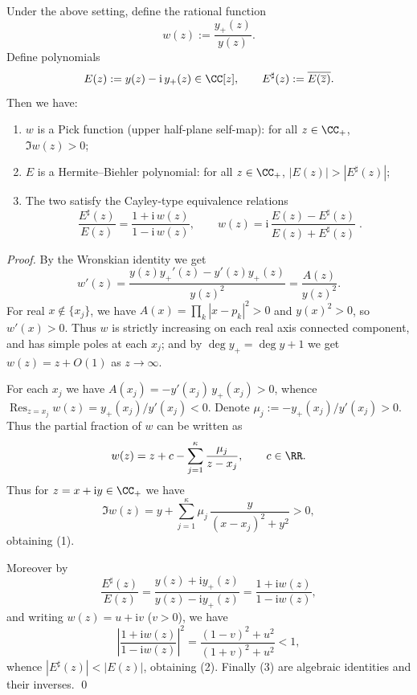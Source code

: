 \begin{conclusion}\label{con:xi-terminal-wronskian-hermite-biehler-pick-map}
Under the above setting, define the rational function
\[
w(z):=\frac{y_{+}(z)}{y(z)}.
\]
Define polynomials
\[
E(z):=y(z)-\mathrm{i}\,y_{+}(z)\in\CC[z],\qquad
E^\sharp(z):=\overline{E(\overline z)}.
\]
Then we have:
\begin{enumerate}
  \item \(w\) is a Pick function (upper half-plane self-map): for all \(z\in\CC_{+}\), \(\Im w(z)>0\);
  \item \(E\) is a Hermite--Biehler polynomial: for all \(z\in\CC_{+}\), \(|E(z)|>|E^\sharp(z)|\);
  \item The two satisfy the Cayley-type equivalence relations
  \[
  \boxed{\;
  \frac{E^\sharp(z)}{E(z)}=\frac{1+\mathrm{i}\,w(z)}{1-\mathrm{i}\,w(z)},
  \qquad
  w(z)=\mathrm{i}\,\frac{E(z)-E^\sharp(z)}{E(z)+E^\sharp(z)}\; } .
  \]
\end{enumerate}
\end{conclusion}
\begin{proof}
By the Wronskian identity we get
\[
w'(z)=\frac{y(z)y_{+}'(z)-y'(z)y_{+}(z)}{y(z)^2}=\frac{A(z)}{y(z)^2}.
\]
For real \(x\notin\{x_j\}\), we have \(A(x)=\prod_k|x-p_k|^2>0\) and \(y(x)^2>0\), so \(w'(x)>0\).
Thus \(w\) is strictly increasing on each real axis connected component, and has simple poles at each \(x_j\); and by \(\deg y_{+}=\deg y+1\) we get \(w(z)=z+O(1)\) as \(z\to\infty\).
\par
For each \(x_j\) we have \(A(x_j)=-y'(x_j)\,y_{+}(x_j)>0\), whence
\(
\operatorname*{Res}_{z=x_j}w(z)=y_{+}(x_j)/y'(x_j)<0
\).
Denote \(\mu_j:=-y_{+}(x_j)/y'(x_j)>0\).
Thus the partial fraction of \(w\) can be written as
\[
w(z)=z+c-\sum_{j=1}^{\kappa}\frac{\mu_j}{z-x_j},\qquad c\in\RR.
\]
Thus for \(z=x+\mathrm{i}y\in\CC_{+}\) we have
\[
\Im w(z)=y+\sum_{j=1}^{\kappa}\mu_j\,\frac{y}{(x-x_j)^2+y^2}>0,
\]
obtaining (1).
\par
Moreover by
\[
\frac{E^\sharp(z)}{E(z)}
=\frac{y(z)+\mathrm{i}y_{+}(z)}{y(z)-\mathrm{i}y_{+}(z)}
=\frac{1+\mathrm{i}w(z)}{1-\mathrm{i}w(z)},
\]
and writing \(w(z)=u+\mathrm{i}v\) (\(v>0\)), we have
\[
\left|\frac{1+\mathrm{i}w(z)}{1-\mathrm{i}w(z)}\right|^2
=\frac{(1-v)^2+u^2}{(1+v)^2+u^2}<1,
\]
whence \(|E^\sharp(z)|<|E(z)|\), obtaining (2).
Finally (3) are algebraic identities and their inverses. \qed
\end{proof}

